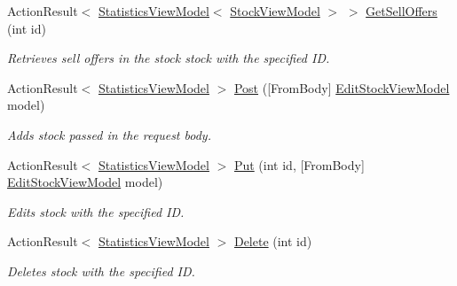 \begin{DoxyCompactItemize}
Action\+Result$<$ \mbox{\hyperlink{class_gielda_l2_1_1_a_p_i_1_1_view_models_1_1_view_1_1_statistics_view_model}{Statistics\+View\+Model}}$<$ \mbox{\hyperlink{class_gielda_l2_1_1_a_p_i_1_1_view_models_1_1_view_1_1_stock_view_model}{Stock\+View\+Model}} $>$ $>$ \mbox{\hyperlink{class_gielda_l2_1_1_a_p_i_1_1_controllers_1_1_stocks_controller_afd88e89d20e7a3cbb333b685e0e38a56}{Get\+Sell\+Offers}} (int id)
\begin{DoxyCompactList}\small\item\em Retrieves sell offers in the stock stock with the specified ID. \end{DoxyCompactList}\item 
Action\+Result$<$ \mbox{\hyperlink{class_gielda_l2_1_1_a_p_i_1_1_view_models_1_1_view_1_1_statistics_view_model}{Statistics\+View\+Model}} $>$ \mbox{\hyperlink{class_gielda_l2_1_1_a_p_i_1_1_controllers_1_1_stocks_controller_af9f6e39e439883c0c2af93a3081213ec}{Post}} (\mbox{[}From\+Body\mbox{]} \mbox{\hyperlink{class_gielda_l2_1_1_a_p_i_1_1_view_models_1_1_edit_1_1_edit_stock_view_model}{Edit\+Stock\+View\+Model}} model)
\begin{DoxyCompactList}\small\item\em Adds stock passed in the request body. \end{DoxyCompactList}\item 
Action\+Result$<$ \mbox{\hyperlink{class_gielda_l2_1_1_a_p_i_1_1_view_models_1_1_view_1_1_statistics_view_model}{Statistics\+View\+Model}} $>$ \mbox{\hyperlink{class_gielda_l2_1_1_a_p_i_1_1_controllers_1_1_stocks_controller_af172a21247d956b8dca216622ad0caaf}{Put}} (int id, \mbox{[}From\+Body\mbox{]} \mbox{\hyperlink{class_gielda_l2_1_1_a_p_i_1_1_view_models_1_1_edit_1_1_edit_stock_view_model}{Edit\+Stock\+View\+Model}} model)
\begin{DoxyCompactList}\small\item\em Edits stock with the specified ID. \end{DoxyCompactList}\item 
Action\+Result$<$ \mbox{\hyperlink{class_gielda_l2_1_1_a_p_i_1_1_view_models_1_1_view_1_1_statistics_view_model}{Statistics\+View\+Model}} $>$ \mbox{\hyperlink{class_gielda_l2_1_1_a_p_i_1_1_controllers_1_1_stocks_controller_ad83a73170f0d55d1b08353e76adef581}{Delete}} (int id)
\begin{DoxyCompactList}\small\item\em Deletes stock with the specified ID. \end{DoxyCompactList}\end{DoxyCompactItemize}


